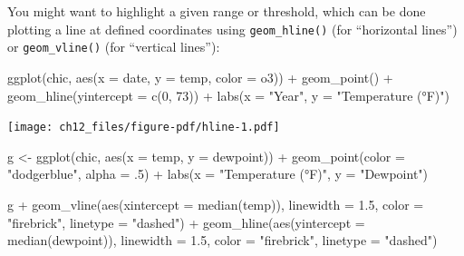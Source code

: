 \documentclass[
  letterpaper,
]{scrbook}
\newenvironment{Shaded}{\begin{snugshade}}{\end{snugshade}}
\newcommand{\AttributeTok}[1]{\textcolor[rgb]{0.40,0.45,0.13}{#1}}
\newcommand{\DecValTok}[1]{\textcolor[rgb]{0.68,0.00,0.00}{#1}}
\newcommand{\FloatTok}[1]{\textcolor[rgb]{0.68,0.00,0.00}{#1}}
\newcommand{\FunctionTok}[1]{\textcolor[rgb]{0.28,0.35,0.67}{#1}}
\newcommand{\NormalTok}[1]{\textcolor[rgb]{0.00,0.23,0.31}{#1}}
\newcommand{\OtherTok}[1]{\textcolor[rgb]{0.00,0.23,0.31}{#1}}
\newcommand{\SpecialCharTok}[1]{\textcolor[rgb]{0.37,0.37,0.37}{#1}}
\newcommand{\StringTok}[1]{\textcolor[rgb]{0.13,0.47,0.30}{#1}}
\begin{document}
You might want to highlight a given range or threshold, which can be
done plotting a line at defined coordinates using \texttt{geom\_hline()}
(for ``horizontal lines'') or \texttt{geom\_vline()} (for ``vertical
lines''):

\begin{Shaded}
\begin{Highlighting}[]
\FunctionTok{ggplot}\NormalTok{(chic, }\FunctionTok{aes}\NormalTok{(}\AttributeTok{x =}\NormalTok{ date, }\AttributeTok{y =}\NormalTok{ temp, }\AttributeTok{color =}\NormalTok{ o3)) }\SpecialCharTok{+}
  \FunctionTok{geom\_point}\NormalTok{() }\SpecialCharTok{+}
  \FunctionTok{geom\_hline}\NormalTok{(}\AttributeTok{yintercept =} \FunctionTok{c}\NormalTok{(}\DecValTok{0}\NormalTok{, }\DecValTok{73}\NormalTok{)) }\SpecialCharTok{+}
  \FunctionTok{labs}\NormalTok{(}\AttributeTok{x =} \StringTok{"Year"}\NormalTok{, }\AttributeTok{y =} \StringTok{"Temperature (°F)"}\NormalTok{)}
\end{Highlighting}
\end{Shaded}

\texttt{[image: ch12\_files/figure-pdf/hline-1.pdf]}

\begin{Shaded}
\begin{Highlighting}[]
\NormalTok{g }\OtherTok{\textless{}{-}} \FunctionTok{ggplot}\NormalTok{(chic, }\FunctionTok{aes}\NormalTok{(}\AttributeTok{x =}\NormalTok{ temp, }\AttributeTok{y =}\NormalTok{ dewpoint)) }\SpecialCharTok{+}
  \FunctionTok{geom\_point}\NormalTok{(}\AttributeTok{color =} \StringTok{"dodgerblue"}\NormalTok{, }\AttributeTok{alpha =}\NormalTok{ .}\DecValTok{5}\NormalTok{) }\SpecialCharTok{+}
  \FunctionTok{labs}\NormalTok{(}\AttributeTok{x =} \StringTok{"Temperature (°F)"}\NormalTok{, }\AttributeTok{y =} \StringTok{"Dewpoint"}\NormalTok{)}

\NormalTok{g }\SpecialCharTok{+}
  \FunctionTok{geom\_vline}\NormalTok{(}\FunctionTok{aes}\NormalTok{(}\AttributeTok{xintercept =} \FunctionTok{median}\NormalTok{(temp)), }\AttributeTok{linewidth =} \FloatTok{1.5}\NormalTok{,}
             \AttributeTok{color =} \StringTok{"firebrick"}\NormalTok{, }\AttributeTok{linetype =} \StringTok{"dashed"}\NormalTok{) }\SpecialCharTok{+}
  \FunctionTok{geom\_hline}\NormalTok{(}\FunctionTok{aes}\NormalTok{(}\AttributeTok{yintercept =} \FunctionTok{median}\NormalTok{(dewpoint)), }\AttributeTok{linewidth =} \FloatTok{1.5}\NormalTok{,}
             \AttributeTok{color =} \StringTok{"firebrick"}\NormalTok{, }\AttributeTok{linetype =} \StringTok{"dashed"}\NormalTok{)}
\end{Highlighting}
\end{Shaded}
\end{document}
